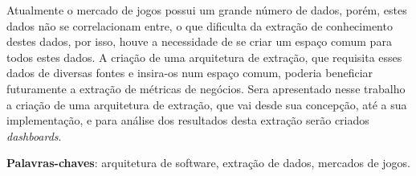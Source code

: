 \begin{resumo}

Atualmente o mercado de jogos possui um grande número de dados, porém, estes dados não se correlacionam entre, o que dificulta da extração de conhecimento destes dados, por isso, houve a necessidade de se criar um espaço comum para todos estes dados. A criação de uma arquitetura de extração, que requisita esses dados de diversas fontes e insira-os num espaço comum, poderia beneficiar futuramente a extração de métricas de negócios. Sera apresentado nesse trabalho a criação de uma arquitetura de extração, que vai desde sua concepção, até a sua implementação, e para análise dos resultados desta extração serão criados \textit{dashboards}.

\vspace{\onelineskip}
    
\noindent
\textbf{Palavras-chaves}: arquitetura de software, extração de dados, mercados de jogos.
\end{resumo}
